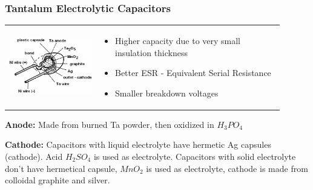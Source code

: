 \documentclass{beamer}
\begin{document}
	\begin{frame}
    \frametitle{Tantalum Electrolytic Capacitors}
		\begin{tabular}{m{0.3\linewidth} m{0.6\linewidth}}
		\includegraphics[scale=0.35]{obr15_tantalum.png} &
		\begin{itemize}
			\item Higher capacity due to very small insulation thickness
			\item Better ESR - Equivalent Serial Resistance
			\item Smaller breakdown voltages
		\end{itemize}
		\end{tabular}
		\textbf{Anode:} Made from burned Ta powder, then oxidized in $H_3PO_4$
		\begin{flushleft}
		\textbf{Cathode:} Capacitors with liquid electrolyte have hermetic Ag capsules (cathode). Acid $H_2SO_4$ is used as electrolyte. Capacitors with solid electrolyte don't have hermetical capsule, $MnO_2$ is used as electrolyte, cathode is made from colloidal graphite and silver.
		\end{flushleft}

  \end{frame}
\end{document}
